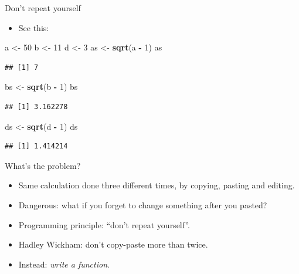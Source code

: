 \documentclass[
  ignorenonframetext,
]{beamer}
\newenvironment{Shaded}{\begin{snugshade}}{\end{snugshade}}
\newcommand{\DecValTok}[1]{\textcolor[rgb]{0.00,0.00,0.81}{#1}}
\newcommand{\KeywordTok}[1]{\textcolor[rgb]{0.13,0.29,0.53}{\textbf{#1}}}
\newcommand{\NormalTok}[1]{#1}
\newcommand{\OperatorTok}[1]{\textcolor[rgb]{0.81,0.36,0.00}{\textbf{#1}}}
\newcommand{\StringTok}[1]{\textcolor[rgb]{0.31,0.60,0.02}{#1}}
\providecommand{\tightlist}{%
  \setlength{\itemsep}{0pt}\setlength{\parskip}{0pt}}
\begin{document}
\begin{frame}[fragile]{Don't repeat yourself}
\protect\hypertarget{dont-repeat-yourself}{}

\begin{itemize}
\tightlist
\item
  See this:
\end{itemize}

\begin{Shaded}
\begin{Highlighting}[]
\NormalTok{a <-}\StringTok{ }\DecValTok{50}
\NormalTok{b <-}\StringTok{ }\DecValTok{11}
\NormalTok{d <-}\StringTok{ }\DecValTok{3}
\NormalTok{as <-}\StringTok{ }\KeywordTok{sqrt}\NormalTok{(a }\OperatorTok{-}\StringTok{ }\DecValTok{1}\NormalTok{)}
\NormalTok{as}
\end{Highlighting}
\end{Shaded}

\begin{verbatim}
## [1] 7
\end{verbatim}

\begin{Shaded}
\begin{Highlighting}[]
\NormalTok{bs <-}\StringTok{ }\KeywordTok{sqrt}\NormalTok{(b }\OperatorTok{-}\StringTok{ }\DecValTok{1}\NormalTok{)}
\NormalTok{bs}
\end{Highlighting}
\end{Shaded}

\begin{verbatim}
## [1] 3.162278
\end{verbatim}

\begin{Shaded}
\begin{Highlighting}[]
\NormalTok{ds <-}\StringTok{ }\KeywordTok{sqrt}\NormalTok{(d }\OperatorTok{-}\StringTok{ }\DecValTok{1}\NormalTok{)}
\NormalTok{ds}
\end{Highlighting}
\end{Shaded}

\begin{verbatim}
## [1] 1.414214
\end{verbatim}

\end{frame}

\begin{frame}{What's the problem?}
\protect\hypertarget{whats-the-problem}{}

\begin{itemize}
\item
  Same calculation done three different times, by copying, pasting and
  editing.
\item
  Dangerous: what if you forget to change something after you pasted?
\item
  Programming principle: ``don't repeat yourself''.
\item
  Hadley Wickham: don't copy-paste more than twice.
\item
  Instead: \emph{write a function}.
\end{itemize}

\end{frame}
\end{document}
